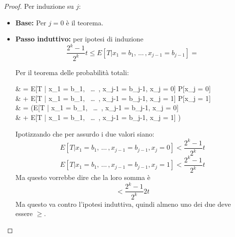 \begin{proof}
	Per induzione su $j$:
	\begin{itemize}
		\item \textbf{Base:} Per $j=0$ è il teorema.\\
		
		\item \textbf{Passo induttivo:} per ipotesi di induzione
		$$\frac{2^k-1}{2^k} t \leq  E[T |  x_1 = b_1, \, \dots \, , x_{j-1} = b_{j-1}] = $$
		
		Per il teorema delle probabilità totali:
		\begin{flalign*}
			& = E[T | x_1 = b_1, \, \dots \, , x_{j-1} = b_{j-1}, x_j = 0] P[x_j = 0]  \\
			& \hspace*{3cm} + E[T | x_1 = b_1, \, \dots \, , x_{j-1} = b_{j-1}, x_j = 1] P[x_j = 1] \\
			& =  (E[T | x_1 = b_1, \, \dots \, , x_{j-1} = b_{j-1}, x_j = 0] \\ 
			& \hspace*{3cm} + E[T | x_1 = b_1, \, \dots \, , x_{j-1} = b_{j-1}, x_j = 1] )
		\end{flalign*}
		Ipotizzando che per assurdo i due valori siano: 
		$$ 
		E[T | x_1 = b_1, \, \dots \, , x_{j-1} = b_{j-1}, x_j = 0] < \frac{2^k-1}{2^k} t
		$$
		$$
		E[T | x_1 = b_1, \, \dots \, , x_{j-1} = b_{j-1}, x_j = 1] < \frac{2^k-1}{2^k} t
		$$
		Ma questo vorrebbe dire che la loro somma è
		$$ 
		< \frac{2^k - 1}{2^k} 2t 
		$$
		Ma questo va contro l'ipotesi induttiva, quindi almeno uno dei due deve essere $\geq$.\\
	\end{itemize}
\end{proof}



